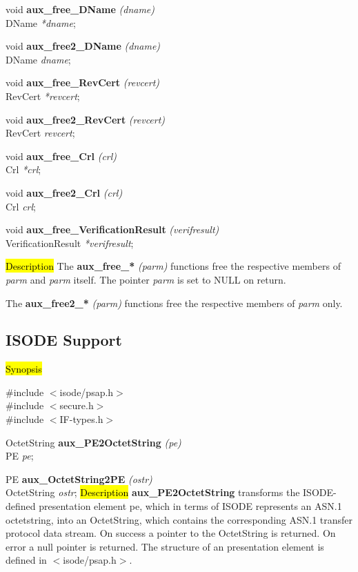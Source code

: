 void {\bf aux\_free\_DName} {\em (dname)} \\
DName {\em **dname};

void {\bf aux\_free2\_DName} {\em (dname)} \\
DName {\em *dname};

void {\bf aux\_free\_RevCert} {\em (revcert)} \\
RevCert {\em **revcert};

void {\bf aux\_free2\_RevCert} {\em (revcert)} \\
RevCert {\em *revcert};

void {\bf aux\_free\_Crl} {\em (crl)} \\
Crl {\em **crl};

void {\bf aux\_free2\_Crl} {\em (crl)} \\
Crl {\em *crl};

void {\bf aux\_free\_VerificationResult} {\em (verifresult)} \\
VerificationResult {\em **verifresult};

\hl{Description}
The {\bf aux\_free\_*} {\em (parm)} functions free the respective members of {\em *parm}
and {\em *parm} itself. The pointer {\em *parm} is set to NULL on return.

The {\bf aux\_free2\_*} {\em (parm)} functions free the respective members of {\em parm}
only.

\subsection{ISODE Support}
\label{aux_isode}
\hl{Synopsis}

\#include $<$isode/psap.h$>$ \\
\#include $<$secure.h$>$ \\
\#include $<$IF-types.h$>$ 

OctetString {\bf *aux\_PE2OctetString} {\em  (pe)} \\
PE {\em pe};

PE {\bf aux\_OctetString2PE} {\em (ostr)} \\
OctetString {\em *ostr};
\hl{Description}
{\bf aux\_PE2OctetString}
transforms the ISODE-defined presentation element pe, which
in terms of ISODE represents an ASN.1 octetstring,
into an OctetString, which contains the corresponding ASN.1 transfer
protocol data stream.
On success a pointer to the OctetString is returned.
On error a null pointer is returned.
The structure of an presentation element is defined in $<$isode/psap.h$>$.

